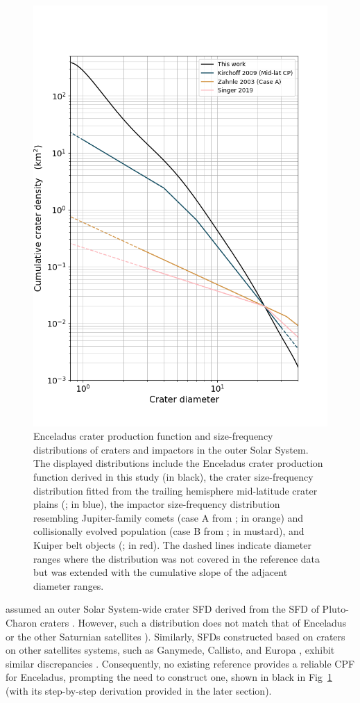 \documentclass[preprint,12pt,3p,times,authoryear]{elsarticle}
\begin{document}
\begin{figure}[H]
    \centering
    \includegraphics[width=0.8\linewidth]{fig/compare_enc_terrains_degpoly_FigS3.png}
    \caption{Enceladus crater production function and size-frequency distributions of craters and impactors in the outer Solar System. The displayed distributions include the Enceladus crater production function derived in this study (in black), the crater size-frequency distribution fitted from the trailing hemisphere mid-latitude crater plains (\citet{Kirchoff2009}; in blue), the impactor size-frequency distribution resembling Jupiter-family comets (case A from \citet{Zahnle2003}; in orange) and collisionally evolved population (case B from \citet{Zahnle2003}; in mustard), and Kuiper belt objects (\citet{Singer2019}; in red). The dashed lines indicate diameter ranges where the distribution was not covered in the reference data but was extended with the cumulative slope of the adjacent diameter ranges.}
    \label{fig:cpf_compare}
\end{figure}

\citet{Wong2023} assumed an outer Solar System-wide crater SFD derived from the SFD of Pluto-Charon craters \citep[red line in Fig~\ref{fig:cpf_compare}]{Singer2019}. However, such a distribution does not match that of Enceladus or the other Saturnian satellites \citep[blue line]{Kirchoff2022}). Similarly, SFDs constructed based on craters on other satellites systems, such as Ganymede, Callisto, and Europa \citep[orange line]{Zahnle2003}, exhibit similar discrepancies \citep{Wong2023}. Consequently, no existing reference provides a reliable CPF for Enceladus, prompting the need to construct one, shown in black in Fig~\ref{fig:cpf_compare} (with its step-by-step derivation provided in the later section). \\
\end{document}
